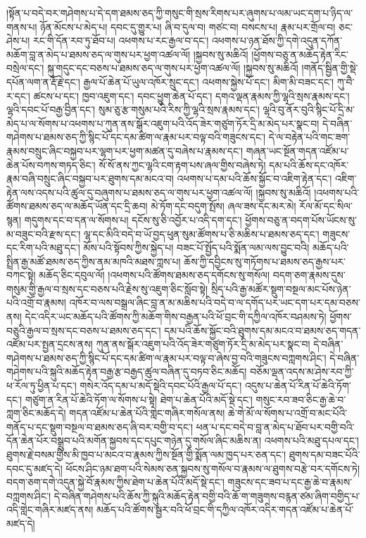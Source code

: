 །སྟོན་པ་བདེ་བར་གཤེགས་པ་དེ་དག་ཐམས་ཅད་ཀྱི་གསུང་གི་སྲས་རིགས་པར་ཞུགས་པ་ལམ་ཡང་དག་པ་ཉིད་ལ་གནས་པ། ཉོན་མོངས་པ་མེད་པ། དབང་དུ་གྱུར་པ། ཞི་བ་དུལ་བ། གཙང་བ། བསངས་པ། རྣམ་པར་གྲོལ་བ། ཅང་ཤེས་པ། རང་གི་དོན་རབ་ཏུ་ཐོབ་པ། འཕགས་པ་རང་རྒྱལ་བ་དང་། འཕགས་པ་ཉན་ཐོས་ཀྱི་དགེ་འདུན་དཀོན་མཆོག་བླ་ན་མེད་པ་ཐམས་ཅད་ལ་གུས་པར་ཕྱག་འཚལ་ལོ། །སྐྱབས་སུ་མཆིའོ། །ཕྱོགས་བཅུ་ན་མཆོད་རྟེན་རིང་བསྲེལ་དང་། སྐུ་གདུང་དང་བཅས་པ་ཐམས་ཅད་ལ་གུས་པར་ཕྱག་འཚལ་ལོ། །སྐྱབས་སུ་མཆིའོ། །གནོད་སྦྱིན་གྱི་སྡེ་དཔོན་ལག་ན་རྡོ་རྗེ་དང་། རྒྱལ་པོ་ཆེན་པོ་ཡུལ་འཁོར་སྲུང་དང་། འཕགས་སྐྱེས་པོ་དང་། མིག་མི་བཟང་དང་། ཀུ་བཻ་ར་དང་། ཚངས་པ་དང་། ཁྱབ་འཇུག་དང་། དབང་ཕྱུག་ཆེན་པོ་དང་། དགའ་ལྡན་རྣམས་ཀྱི་ལྷའི་སྲས་རྣམས་དང་། ལྷའི་དབང་པོ་བརྒྱ་བྱིན་དང་། སུམ་ཅུ་རྩ་གསུམ་པའི་རིས་ཀྱི་ལྷའི་སྲས་རྣམས་དང་། ལྷའི་བུ་ནོར་བུའི་སྙིང་པོ་དྲི་མ་མེད་པ་ལ་སོགས་པ་འཕགས་པ་ཀུན་ནས་སྒོར་འཇུག་པའི་འོད་ཟེར་གཙུག་ཏོར་དྲི་མ་མེད་པར་སྣང་བ། དེ་བཞིན་གཤེགས་པ་ཐམས་ཅད་ཀྱི་སྙིང་པོ་དང་དམ་ཚིག་ལ་རྣམ་པར་བལྟ་བའི་གཟུངས་དང་། དེ་ལ་བརྟེན་པའི་གང་ཟག་རྣམས་བསྲུང་ཞིང་བསྐྱབ་པར་ལྷག་པར་ཕྱག་མཚན་དུ་བཞེས་པ་རྣམས་དང་། གཞན་ཡང་སྔོན་གདན་འཛོམ་པ་ཆེན་པོས་བཀས་གཏད་ཅིང་། སོ་སོ་ནས་ཀྱང་ལྷའི་ངག་རྟག་པས་ཞལ་གྱིས་བཞེས་ཏེ། དམ་པའི་ཆོས་དང་འཁོར་རྣམ་བཞི་བསྲུང་ཞིང་བསྐྱབ་པར་ཐུགས་དམ་མངའ་བ། འཕགས་པ་དམ་པའི་ཆོས་སྐྱོང་བ་འཇིག་རྟེན་དང་། འཇིག་རྟེན་ལས་འདས་པའི་ཚུལ་དུ་བཞུགས་པ་ཐམས་ཅད་ལ་གུས་པར་ཕྱག་འཚལ་ལོ། །སྐྱབས་སུ་མཆིའོ། །འཕགས་པའི་ཚོགས་ཐམས་ཅད་ལ་མཆོད་ཡོན་དང་དྲི་ཆབ། མེ་ཏོག་དང་བདུག་སྤོས། ཞལ་ཟས་དང་མར་མེ། རོལ་མོ་དང་སིལ་སྙན། གདུགས་དང་བ་དན་ལ་སོགས་པ། དངོས་སུ་ཅི་འབྱོར་པ་འདི་དག་དང་། ཕྱོགས་བཅུ་ན་བདག་པོས་ཡོངས་སུ་མ་བཟུང་བའི་རྫས་དང་། ལྷ་དང་མིའི་བདེ་བ་ཡོ་བྱད་ཕུན་སུམ་ཚོགས་པ་ཅི་མཆིས་པ་ཐམས་ཅད་དང་། གཟུངས་དང་རིག་པའི་མཐུ་དང་། མོས་པའི་སྟོབས་ཀྱིས་སྐྱེད་པ། བཟང་པོ་སྤྱོད་པའི་སྨོན་ལམ་ལས་བྱུང་བའི། མཆོད་པའི་སྤྲིན་རྒྱ་མཚོ་ཐམས་ཅད་ཀྱིས་ནམ་མཁའི་མཐས་ཀླས་པ། ཆོས་ཀྱི་དབྱིངས་སུ་གཏོགས་པ་ཐམས་ཅད་རྒྱས་པར་བཀང་སྟེ། མཆོད་ཅིང་དབུལ་ལོ། །འཕགས་པའི་ཚོགས་ཐམས་ཅད་དགོངས་སུ་གསོལ། བདག་ཅག་རྣམས་དུས་གསུམ་གྱི་རྒྱལ་བ་སྲས་དང་བཅས་པའི་རྗེས་སུ་འཇུག་ཅིང་སློབ་སྟེ། སྲིད་པའི་རྒྱ་མཚོར་སྡུག་བསྔལ་མང་པོས་ཉེན་པའི་འགྲོ་བ་རྣམས། འཁོར་བ་ལས་བསྒྲལ་ཞིང་བླ་ན་མ་མཆིས་པའི་བདེ་བ་ལ་དགོད་པར་ཡང་དག་པར་དམ་བཅས་ནས། དེང་འདིར་ཡང་མཆོད་པའི་ཚོགས་ཀྱི་མཆོག་གིས་བརྒྱན་པའི་ཕོ་བྲང་གི་དཀྱིལ་འཁོར་བཤམས་ཏེ། ཕྱོགས་བཅུའི་རྒྱལ་བ་སྲས་དང་བཅས་པ་ཐམས་ཅད་དང་། དམ་པའི་ཆོས་སྐྱོང་བའི་ཐུགས་དམ་མངའ་བ་ཐམས་ཅད་གདན་འཛོམ་པར་སྤྱན་དྲངས་ནས། ཀུན་ནས་སྒོར་འཇུག་པའི་འོད་ཟེར་གཙུག་ཏོར་དྲི་མ་མེད་པར་སྣང་བ། དེ་བཞིན་གཤེགས་པ་ཐམས་ཅད་ཀྱི་སྙིང་པོ་དང་དམ་ཚིག་ལ་རྣམ་པར་བལྟ་བ་ཞེས་བྱ་བའི་གཟུངས་བཀླགས་ཤིང་། དེ་བཞིན་གཤེགས་པའི་སྐུའི་མཆོད་རྟེན་བརྒྱ་རྩ་བརྒྱད་ཚུལ་བཞིན་དུ་བཏབ་ཅིང་མཆོད། བཅོམ་ལྡན་འདས་མ་ཤེས་རབ་ཀྱི་ཕ་རོལ་ཏུ་ཕྱིན་པ་དང་། གསེར་འོད་དམ་པ་མདོ་སྡེའི་དབང་པོའི་རྒྱལ་པོ་དང་། འདུས་པ་ཆེན་པོ་རིན་པོ་ཆེའི་ཏོག་དང་། གཙུག་ན་རིན་པོ་ཆེའི་ཏོག་ལ་སོགས་པ་སྟེ། ཐེག་པ་ཆེན་པོའི་མདོ་སྡེ་དང་། གསུང་རབ་ཟབ་ཅིང་རྒྱ་ཆེ་བ་ཀླག་ཅིང་མཆོད་དེ། གདན་འཛོམ་པ་ཆེན་པོའི་གླེང་གཞིར་གསོལ་ནས། ཆེ་གེ་མོ་ལ་སོགས་པ་འགྲོ་བ་མང་པོའི་གནོད་པ་དང་སྡུག་བསྔལ་བ་ཐམས་ཅད་ཞི་བར་བགྱི་བ་དང་། ཕན་པ་དང་བདེ་བ་བླ་ན་མེད་པ་ཐོབ་པར་བགྱི་བའི་དོན་ཆེན་པོར་བསྒྲུབ་པའི་མགོན་སྐྱབས་དང་དཔུང་གཉེན་དུ་གསོལ་ཞིང་མཆིས་ན། འཕགས་པའི་མཐུ་དཔལ་དང་། ཐུགས་རྗེ་བསམ་གྱིས་མི་ཁྱབ་པ་མངའ་བ་རྣམས་ཀྱིས་སྔོན་གྱི་སྨོན་ལམ་ཁྱད་པར་ཅན་དང་། ཐུགས་དམ་བཟང་པོའི་དབང་དུ་མཛད་དེ། ཕོངས་ཤིང་ཉམ་ཐག་པའི་སེམས་ཅན་སྐྱབས་སུ་གསོལ་བ་རྣམས་ལ་ཐུགས་བརྩེ་བར་དགོངས་ཏེ། བདག་ཅག་དགེ་འདུན་སྐྱེ་བོ་རྣམས་ཀྱིས་ཐེག་པ་ཆེན་པོའི་མདོ་སྡེ་དང་། གཟུངས་དང་ཟབ་པ་དང་རྒྱ་ཆེ་བ་རྣམས་བཀླགས་ཤིང་། དེ་བཞིན་གཤེགས་པའི་ཆོས་ཀྱི་སྐུའི་མཆོད་རྟེན་བགྱི་བའི་ཆོ་ག་གཟུགས་བརྙན་ཙམ་ཞིག་བགྱིད་པ་འདི་གླེང་གཞིར་མཛད་ནས། མཆོད་པའི་ཚོགས་སྦྱར་བའི་ཕོ་བྲང་གི་དཀྱིལ་འཁོར་འདིར་གདན་འཛོམ་པ་ཆེན་པོ་མཛད་དེ། 